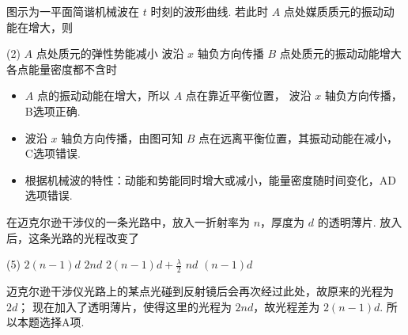 \begin{textfig}
  \begin{problem}[波的能量]
    图示为一平面简谐机械波在 $t$ 时刻的波形曲线. 若此时 $A$ 点处媒质质元的振动动能在增大，则
    \begin{tasks}(2)
      \task $A$ 点处质元的弹性势能减小
      \task[\true] 波沿 $x$ 轴负方向传播
      \task $B$ 点处质元的振动动能增大
      \task 各点能量密度都不含时
    \end{tasks}
  \end{problem}
  \textfigsplit\centering
\end{textfig}
\begin{solution}\leavevmode
  \begin{itemize}
    \item $A$ 点的振动动能在增大，所以 $A$ 点在靠近平衡位置，
    波沿 $x$ 轴负方向传播，B选项正确.
    \item 波沿 $x$ 轴负方向传播，由图可知 $B$ 点在远离平衡位置，其振动动能在减小，
    C选项错误.
    \item 根据机械波的特性：动能和势能同时增大或减小，能量密度随时间变化，AD选项错误.
  \end{itemize}
\end{solution}

\begin{problem}[迈克尔逊干涉仪]
  在迈克尔逊干涉仪的一条光路中，放入一折射率为 $n$，厚度为 $d$ 的透明薄片.
  放入后，这条光路的光程改变了
  \begin{tasks}(5)
    \task[\true] $2(n - 1)d$
    \task $2nd$
    \task $2(n - 1)d + \frac\lambda2$
    \task $nd$
    \task $(n - 1)d$
  \end{tasks}
\end{problem}
\scratch
\begin{solution}
  迈克尔逊干涉仪光路上的某点光碰到反射镜后会再次经过此处，故原来的光程为 $2d$；
  现在加入了透明薄片，使得这里的光程为 $2nd$，故光程差为 $2(n - 1)d$. 所以本题选择A项.
\end{solution}

